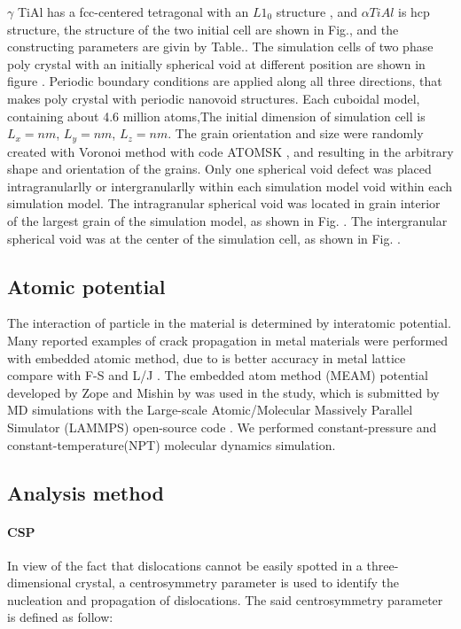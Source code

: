 \documentclass[final,5p,times,twocolumn]{elsarticle}
\begin{document}
$\gamma $ TiAl has a fcc-centered tetragonal with an $L1_0$ structure \cite{}, and $\alpha TiAl$ is hcp structure, the structure of the two initial cell are shown in Fig.\cite{}, and the constructing parameters are givin by Table.\cite{}. The simulation cells of two phase poly crystal with an initially spherical void at different position are shown in figure \cite{}. Periodic boundary conditions are applied along all three directions, that makes poly crystal with periodic nanovoid structures. Each cuboidal model, containing about 4.6 million atoms,The initial dimension of simulation cell is  $L_x = nm$, $L_y =  nm$, $L_z =  nm$. The grain orientation and size were randomly created with Voronoi method with code ATOMSK \cite{}, and resulting in the arbitrary shape and orientation of the grains. Only one spherical void defect was placed intragranularlly or intergranularlly within each simulation model void within each simulation model. The intragranular spherical void was located in grain interior of the largest grain of the simulation model, as shown in Fig. \cite{}. The intergranular spherical void was at the center of the simulation cell, as shown in Fig. \cite{}.



\subsection{Atomic potential}
The interaction of particle in the material is determined by interatomic potential. Many reported examples of crack propagation in metal materials were performed with embedded atomic method, due to is better accuracy in metal lattice compare with F-S and L/J \cite{}. The embedded atom method (MEAM) potential developed by Zope and Mishin by \cite{} was used in the study, which is submitted by MD simulations with the Large-scale Atomic/Molecular Massively Parallel Simulator (LAMMPS) open-source code \cite{}. We performed constant-pressure and constant-temperature(NPT) molecular dynamics simulation.

\subsection{Analysis method}
\paragraph{CSP}
In view of the fact that dislocations cannot be easily spotted in a three-dimensional crystal, a centrosymmetry parameter \cite{} is used to identify the nucleation and propagation of dislocations. The said centrosymmetry parameter is defined as follow:
\end{document}
